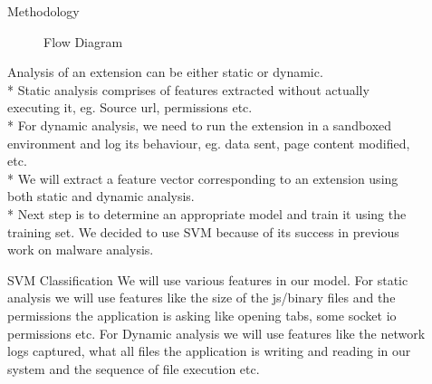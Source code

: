\documentclass[final]{beamer}
\newlength{\sepwid}
\newlength{\onecolwid}
\newlength{\twocolwid}
\begin{document}
\begin{frame}[t]
\begin{columns}[t]
\begin{column}{\twocolwid}
\begin{block}{Methodology}
\begin{figure}
\caption{Flow Diagram}
\end{figure}
Analysis of an extension can be either static or dynamic.\\*
Static analysis comprises of features extracted without actually executing it, eg. Source url, permissions etc.\\*
For dynamic analysis, we need to run the extension in a sandboxed environment and log its behaviour, eg. data sent, page content modified, etc.\\*
We will extract a feature vector corresponding to an extension using both static and dynamic analysis.\\*
Next step is to determine an appropriate model and train it using the training set. We decided to use SVM because of its success in previous work on malware analysis.

\end{block}





\begin{block}{SVM Classification}
We will use various features in our model. For static analysis we will use features  like the size of the js/binary files and the permissions the application is asking   like opening tabs, some socket io permissions etc. For Dynamic analysis we will use features like the network logs captured, what all files the application is writing and reading in our system and the sequence of file execution etc.
\end{block}
\end{column} %

\begin{column}{\sepwid}\end{column} %

\begin{column}{\onecolwid} %




\end{column}
\end{columns}
\end{frame}
\end{document}
